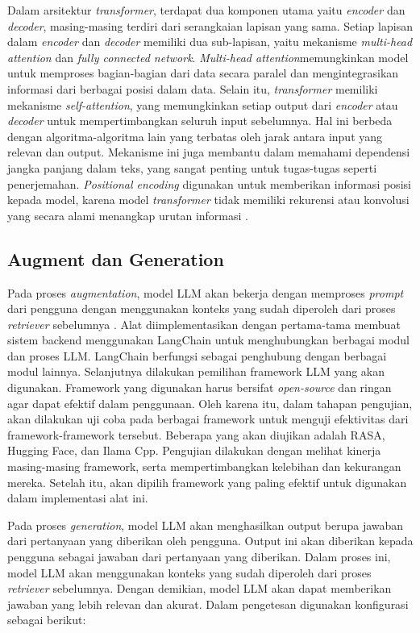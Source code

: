 Dalam arsitektur \emph{transformer}, terdapat dua komponen utama yaitu \emph{encoder} dan \emph{decoder}, masing-masing terdiri dari serangkaian lapisan yang sama. Setiap lapisan dalam \emph{encoder} dan \emph{decoder} memiliki dua sub-lapisan, yaitu mekanisme \emph{multi-head attention} dan \emph{fully connected network}. \emph{Multi-head attention}memungkinkan model untuk memproses bagian-bagian dari data secara paralel dan mengintegrasikan informasi dari berbagai posisi dalam data. Selain itu, \emph{transformer} memiliki mekanisme \emph{self-attention}, yang memungkinkan setiap output dari \emph{encoder} atau \emph{decoder} untuk mempertimbangkan seluruh input sebelumnya. Hal ini berbeda dengan algoritma-algoritma lain yang terbatas oleh jarak antara input yang relevan dan output. Mekanisme ini juga membantu dalam memahami dependensi jangka panjang dalam teks, yang sangat penting untuk tugas-tugas seperti penerjemahan. \emph{Positional encoding} digunakan untuk memberikan informasi posisi kepada model, karena model \emph{transformer} tidak memiliki rekurensi atau konvolusi yang secara alami menangkap urutan informasi \cite{vaswani2017attention}. 

\subsection{Augment dan Generation}
\label{subsec:AugmentGeneration}

Pada proses \emph{augmentation}, model LLM akan bekerja dengan memproses \emph{prompt} dari pengguna dengan menggunakan konteks yang sudah diperoleh dari proses \emph{retriever} sebelumnya \cite{bansal2024llm}. Alat diimplementasikan dengan pertama-tama membuat sistem backend menggunakan LangChain untuk menghubungkan berbagai modul dan proses LLM. LangChain berfungsi sebagai penghubung dengan berbagai modul lainnya. Selanjutnya dilakukan pemilihan framework LLM yang akan digunakan. Framework yang digunakan harus bersifat \emph{open-source} dan ringan agar dapat efektif dalam penggunaan. Oleh karena itu, dalam tahapan pengujian, akan dilakukan uji coba pada berbagai framework untuk menguji efektivitas dari framework-framework tersebut. Beberapa yang akan diujikan adalah RASA, Hugging Face, dan Ilama Cpp. Pengujian dilakukan dengan melihat kinerja masing-masing framework, serta mempertimbangkan kelebihan dan kekurangan mereka. Setelah itu, akan dipilih framework yang paling efektif untuk digunakan dalam implementasi alat ini.

Pada proses \emph{generation}, model LLM akan menghasilkan output berupa jawaban dari pertanyaan yang diberikan oleh pengguna. Output ini akan diberikan kepada pengguna sebagai jawaban dari pertanyaan yang diberikan. Dalam proses ini, model LLM akan menggunakan konteks yang sudah diperoleh dari proses \emph{retriever} sebelumnya. Dengan demikian, model LLM akan dapat memberikan jawaban yang lebih relevan dan akurat. Dalam pengetesan digunakan konfigurasi sebagai berikut:

